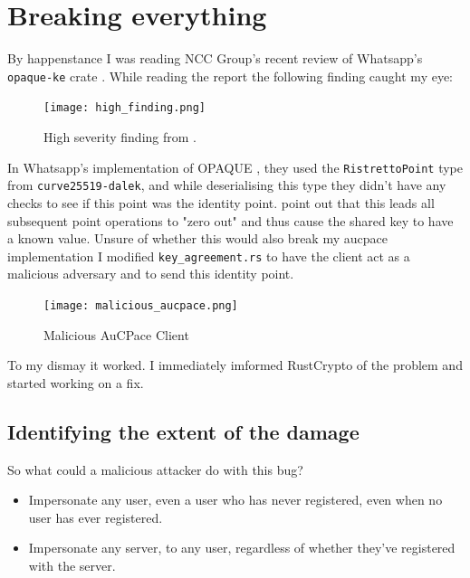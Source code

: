 
\clearpage

\section{Breaking everything}
By happenstance I was reading NCC Group's recent review of Whatsapp's \texttt{opaque-ke} crate \cite{whatsapp-are-dumb-too, whatsapp-are-dumb-too-report}.
While reading the report the following finding caught my eye:
\begin{figure}[H]
  \centering

  \texttt{[image: high\_finding.png]}
  \caption{High severity finding from \cite{whatsapp-are-dumb-too-report}.}
  \label{fig:high-severity-finding}
\end{figure}

In Whatsapp's implementation of OPAQUE \cite{opaque}, they used the \texttt{RistrettoPoint} type from \texttt{curve25519-dalek}, and while deserialising this type they didn't have any checks to see if this point was the identity point.
 point out that this leads all subsequent point operations to "zero out" and thus cause the shared key to have a known value.
Unsure of whether this would also break my \gls{aucpace} implementation I modified \texttt{key\_agreement.rs} to have the client act as a malicious adversary and to send this identity point.


\begin{figure}[H]
  \centering

  \texttt{[image: malicious\_aucpace.png]}
  \caption{Malicious AuCPace Client}
  \label{fig:break-everything}
\end{figure}

To my dismay it worked.
I immediately imformed RustCrypto of the problem and started working on a fix.

\subsection{Identifying the extent of the damage}
So what could a malicious attacker do with this bug?

\begin{itemize}
  \item{Impersonate any user, even a user who has never registered, even when no user has ever registered.}
  \item{Impersonate any server, to any user, regardless of whether they've registered with the server.}
\end{itemize}

